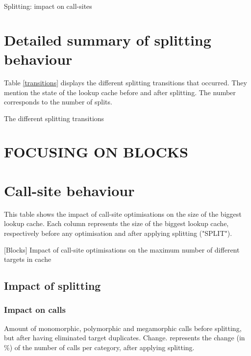 \documentclass[10pt, sigplan, preprint]{acmart}
\begin{document}
\begin{table}[h!]
	\centering
	\tiny
	\AfterSplitSites
	\caption{Splitting: impact on call-sites}
	\label{after_split_call_site}
\end{table}

\section{Detailed summary of splitting behaviour}

Table \ref{transitions} displays the different splitting transitions that occurred. They mention the state of the lookup cache before and after splitting. The number corresponds to the number of splits.

\begin{table}[h!]
	\centering
	\tiny
	\SplittingTransitions
	\caption{The different splitting transitions}
	\label{transitions}
\end{table}

\section{FOCUSING ON BLOCKS}

\section{Call-site behaviour}

This table shows the impact of call-site optimisations on the size of the biggest lookup cache.
Each column represents the size of the biggest lookup cache, respectively before any optimisation and after applying splitting ("SPLIT").

\begin{table}[h!]
	\centering
	\tiny
	\BlockExtent
	\caption{[Blocks] Impact of call-site optimisations on the maximum number of different targets in cache}
\end{table}

\subsection{Impact of splitting}

\subsubsection{\textbf{Impact on calls}}

Amount of monomorphic, polymorphic and megamorphic calls before splitting, but after having eliminated target duplicates.
Change. represents the change (in \%) of the number of calls per category, after applying splitting.
\end{document}
